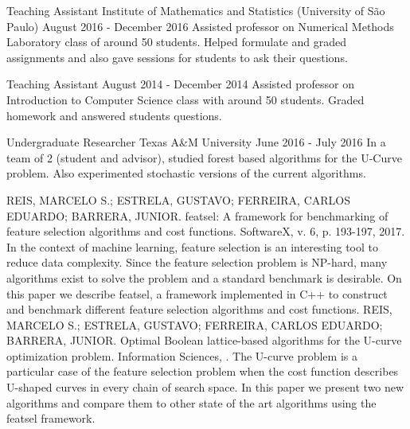 \documentclass[11pt, a4paper]{awesome-cv-res}
\begin{document}
\begin{cventries}
\cventry
{Teaching Assistant}
{Institute of Mathematics and Statistics (University of São Paulo)}
{}
{August 2016 - December 2016}
{Assisted professor on Numerical Methods Laboratory class of around 50
    students. Helped formulate and graded assignments and also gave 
    sessions for students to ask their questions.}

\cventry
{Teaching Assistant}
{}
{}
{August 2014 - December 2014}
{Assisted professor on Introduction to Computer Science class with 
    around 50 students. Graded homework and answered students 
    questions.}

\cventry
{Undergraduate Researcher}
{Texas A\&M University}
{}
{June 2016 - July 2016}
{In a team of 2 (student and advisor), studied forest based algorithms
for the U-Curve problem. Also experimented stochastic versions of the
current algorithms.}
\end{cventries}

\begin{cventries}
\cventry
    {REIS, MARCELO S.; ESTRELA, GUSTAVO; FERREIRA, CARLOS EDUARDO; BARRERA, JUNIOR.}
    {featsel: A framework for benchmarking of feature selection algorithms and cost functions.}
    {SoftwareX, v. 6, p. 193-197, 2017.}
    {}
    {In the context of machine learning, feature selection is an 
    interesting tool to reduce data complexity. Since the feature 
    selection problem is NP-hard, many algorithms exist to solve the 
    problem and a standard benchmark is desirable. On this paper we 
    describe featsel, a framework implemented in C++ to construct and 
    benchmark different feature selection algorithms and cost 
    functions.}
\cventry
    {REIS, MARCELO S.; ESTRELA, GUSTAVO; FERREIRA, CARLOS EDUARDO; BARRERA, JUNIOR.}
    {Optimal Boolean lattice-based algorithms for the U-curve optimization problem.}
    {Information Sciences, .}
    {}
    {The U-curve problem is a particular case of the feature selection
    problem when the cost function describes U-shaped curves in every
    chain of search space. In this paper we present two new algorithms
    and compare them to other state of the art algorithms using the 
    featsel framework.}
\end{cventries}
\end{document}
